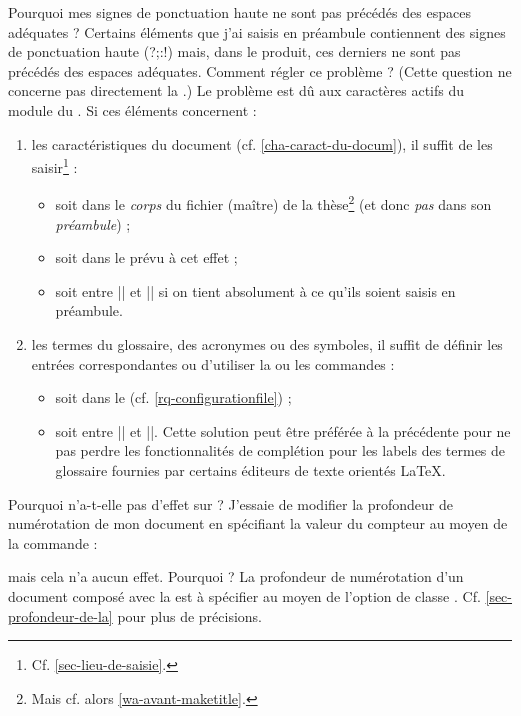 \begin{dbfaq}{Pourquoi mes signes de ponctuation haute ne sont pas précédés des
    espaces adéquates ?}{}
  Certains éléments que j'ai saisis en préambule contiennent des signes de
  ponctuation haute ({\NoAutoSpacing?;:!}) mais, dans le \pdf{} produit, ces
  derniers ne sont pas précédés des espaces adéquates. Comment régler ce
  problème ?
  \tcblower
  (Cette question ne concerne pas directement la \yatCl{}.) Le problème est dû
  aux caractères actifs du module  du . Si ces
  éléments concernent :
  \begin{enumerate}
  \item les caractéristiques du document (cf. \vref{cha-caract-du-docum}), il
    suffit de les saisir\footnote{Cf. \vref{sec-lieu-de-saisie}.} :
    \begin{itemize}
    \item soit dans le \emph{corps} du fichier (maître) de la
      thèse\footnote{Mais cf. alors \vref{wa-avant-maketitle}.} (et donc
      \emph{pas} dans son \emph{préambule}) ;
    \item soit dans le \File{\characteristicsfile} prévu à cet effet ;
    \item soit entre || et || si on tient
      absolument à ce qu'ils soient saisis en préambule.
    \end{itemize}
  \item les termes du glossaire, des acronymes ou des symboles, il suffit de
    définir les entrées correspondantes ou d'utiliser la ou les commandes
     :
    \begin{itemize}
    \item soit dans le \File{\configurationfile}
      (cf. \vref{rq-configurationfile}) ;
    \item soit entre || et ||. Cette
      solution peut être préférée à la précédente pour ne pas perdre les
      fonctionnalités de complétion pour les labels des termes de glossaire
      fournies par certains éditeurs de texte orientés \LaTeX{}.
    \end{itemize}
  \end{enumerate}
\end{dbfaq}

\begin{dbfaq}{Pourquoi \protect{} n'a-t-elle pas
    d'effet sur \protect{} ?}{}
  J'essaie de modifier la profondeur de numérotation de mon document en
  spécifiant la valeur du compteur  au moyen de la
  commande :
\begin{preamblecode}
\end{preamblecode}
  mais cela n'a aucun effet. Pourquoi ?
  \tcblower
  La profondeur de numérotation d'un document composé avec la \yatCl{} est
  à spécifier au moyen de l'option de classe
  . Cf. \vref{sec-profondeur-de-la} pour plus de
  précisions.
\end{dbfaq}

